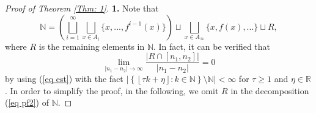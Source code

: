 \documentclass{amsart}
\theoremstyle{definition}
\numberwithin{equation}{section}%
\begin{document}
\begin{proof}[Proof of Theorem \ref{Thm: 1}]     
\item[\bf 1.] Note that 
\begin{equation}\label{eq pf2}
    \mathbb{N}=\left(\bigsqcup_{i=1}^\infty \bigsqcup_{x\in A_i}\{x, ..., f^{i-1}(x)\}\right) \sqcup \bigsqcup_{x\in A_\infty}\{x, f(x), ...\}\sqcup R,
\end{equation}
where $R$ is the remaining elements in $\mathbb{N}$. In fact, it can be verified that \[
\lim_{|n_1-n_2|\to\infty}\frac{|R\cap [n_1,n_2]|}{|n_1-n_2|}=0
\] by using (\ref{eq est}) with the fact $|\left\{ \left\lfloor \tau k+\eta \right\rfloor :k\in 
\mathbb{N}\right\} \setminus \mathbb{N}|<\infty$ for $\tau \geq 1$ and $\eta \in\mathbb{R}$. In order to simplify the proof, in the following, we omit $R$ in the decomposition (\ref{eq pf2}) of $\mathbb{N}$.
     

\end{proof}
\end{document}
